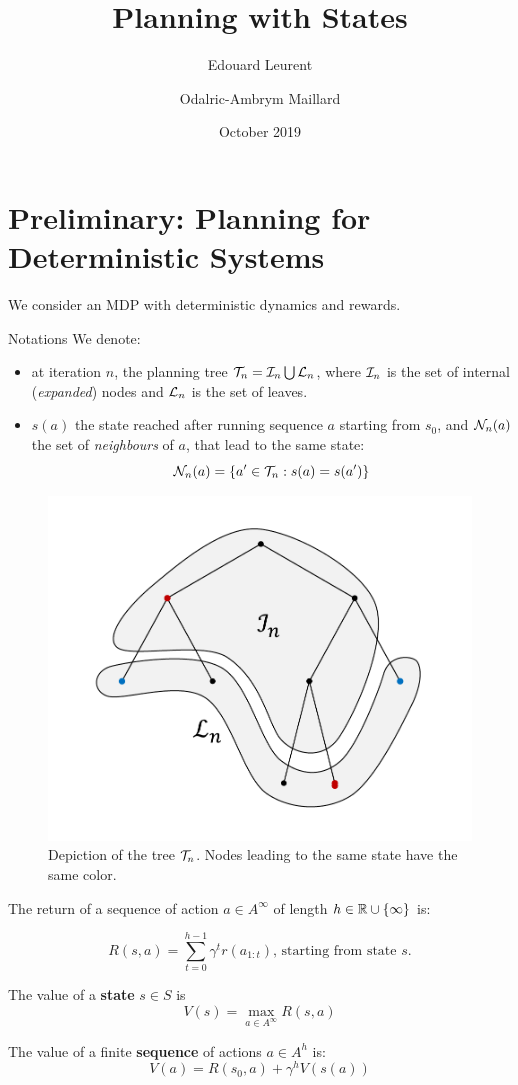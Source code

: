 \documentclass{article}
\title{Planning with States}
\author{Edouard Leurent \and Odalric-Ambrym Maillard}
\date{October 2019}
\begin{document}
\maketitle

\tableofcontents

\section{Preliminary: Planning for Deterministic Systems}

We consider an MDP with deterministic dynamics and rewards.

\begin{paragraph}{Notations}
We denote:
\begin{itemize}
\item at iteration $n$, the planning tree $\mathcal{T}_n = \mathcal{I}_n \bigcup \mathcal{L}_n$, where $\mathcal{I}_n$ is the set of internal (\emph{expanded}) nodes and $\mathcal{L}_n$ is the set of leaves.
\item $s(a)$ the state reached after running sequence $a$ starting from $s_0$, and $\mathcal{N}_n(a)$ the set of \emph{neighbours} of $a$, that lead to the same state:  \[\mathcal{N}_n(a) = \{a'\in\mathcal{T}_n: s(a)=s(a')\}\]
\end{itemize}
\end{paragraph}

\begin{figure}[H]
	\centering
	\includegraphics[trim={1.8cm 1.2cm 1.9cm 1.2cm}, clip,width=0.4\linewidth]{img/tree_1}
	\caption{Depiction of the tree $\mathcal{T}_n$. Nodes leading to the same state have the same color.}
\end{figure}

\begin{definition}[Values]
The return of a sequence of action $a\in A^\infty$ of length $h\in\mathbb{R}\cup\{\infty\}$ is:

\[R(s,a) = \sum_{t=0}^{h-1} \gamma^t r(a_{1:t}) ,\, \text{starting from state $s$.}\]

The value of a \textbf{state} $s\in S$ is
\begin{equation}
    V(s) = \max_{a\in A^\infty} R(s, a)
\end{equation}

The value of a finite \textbf{sequence} of actions $a\in A^h$ is:
\begin{equation}
\label{eq:state_value}
    V(a) = R(s_0,a) + \gamma^{h} V(s(a))
\end{equation}
\end{definition}
\end{document}
